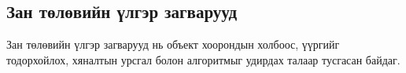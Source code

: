 
\subsection{Зан төлөвийн үлгэр загварууд}
Зан төлөвийн үлгэр загварууд нь объект хоорондын холбоос, үүргийг тодорхойлох, хяналтын урсгал болон алгоритмыг удирдах талаар тусгасан байдаг.

